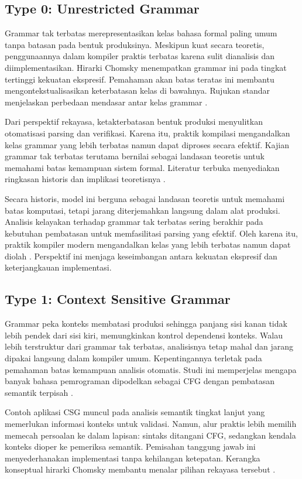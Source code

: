 \documentclass[../main.tex]{subfiles}
\begin{document}
\subsection{Type 0: Unrestricted Grammar}
Grammar tak terbatas merepresentasikan kelas bahasa formal paling umum tanpa batasan pada bentuk produksinya. Meskipun kuat secara teoretis, penggunaannya dalam kompiler praktis terbatas karena sulit dianalisis dan diimplementasikan. Hirarki Chomsky menempatkan grammar ini pada tingkat tertinggi kekuatan ekspresif. Pemahaman akan batas teratas ini membantu mengontekstualisasikan keterbatasan kelas di bawahnya. Rujukan standar menjelaskan perbedaan mendasar antar kelas grammar \citep{WikiChomsky}.

Dari perspektif rekayasa, ketakterbatasan bentuk produksi menyulitkan otomatisasi parsing dan verifikasi. Karena itu, praktik kompilasi mengandalkan kelas grammar yang lebih terbatas namun dapat diproses secara efektif. Kajian grammar tak terbatas terutama bernilai sebagai landasan teoretis untuk memahami batas kemampuan sistem formal. Literatur terbuka menyediakan ringkasan historis dan implikasi teoretisnya \citep{WikiChomsky}.

Secara historis, model ini berguna sebagai landasan teoretis untuk memahami batas komputasi, tetapi jarang diterjemahkan langsung dalam alat produksi. Analisis kelayakan terhadap grammar tak terbatas sering berakhir pada kebutuhan pembatasan untuk memfasilitasi parsing yang efektif. Oleh karena itu, praktik kompiler modern mengandalkan kelas yang lebih terbatas namun dapat diolah \citep{WikiChomsky}. Perspektif ini menjaga keseimbangan antara kekuatan ekspresif dan keterjangkauan implementasi.

\subsection{Type 1: Context Sensitive Grammar}
Grammar peka konteks membatasi produksi sehingga panjang sisi kanan tidak lebih pendek dari sisi kiri, memungkinkan kontrol dependensi konteks. Walau lebih terstruktur dari grammar tak terbatas, analisisnya tetap mahal dan jarang dipakai langsung dalam kompiler umum. Kepentingannya terletak pada pemahaman batas kemampuan analisis otomatis. Studi ini memperjelas mengapa banyak bahasa pemrograman dipodelkan sebagai CFG dengan pembatasan semantik terpisah \citep{WikiChomsky}.

Contoh aplikasi CSG muncul pada analisis semantik tingkat lanjut yang memerlukan informasi konteks untuk validasi. Namun, alur praktis lebih memilih memecah persoalan ke dalam lapisan: sintaks ditangani CFG, sedangkan kendala konteks dioper ke pemeriksa semantik. Pemisahan tanggung jawab ini menyederhanakan implementasi tanpa kehilangan ketepatan. Kerangka konseptual hirarki Chomsky membantu menalar pilihan rekayasa tersebut \citep{WikiChomsky}.
\end{document}
